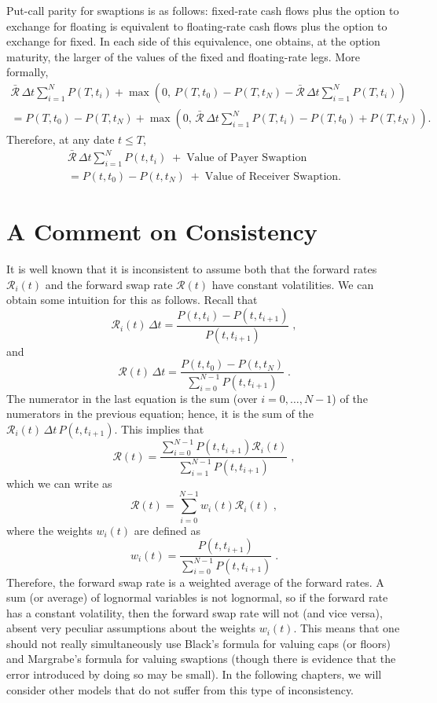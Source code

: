 Put-call parity  for swaptions is as follows: fixed-rate cash flows plus the option to exchange for floating is equivalent to floating-rate cash flows plus the option to exchange for fixed.  In each side of this equivalence, one obtains, at the option maturity, the larger of the values of the fixed and floating-rate legs.  More formally,
\begin{multline*} \bar{\mathcal{R}}\,\varDelta t \sum_{i=1}^N P(T,t_i) + \max\left(0, \,P(T,t_0)- P(T,t_N)-  \bar{\mathcal{R}}\,\varDelta t \sum_{i=1}^N P(T,t_i)\right) \\= P(T,t_0)- P(T,t_N) + \max\left(0,\,  \bar{\mathcal{R}}\,\varDelta t \sum_{i=1}^N P(T,t_i)-P(T,t_0)+ P(T,t_N)\right).
\end{multline*}
Therefore, at any date $t \leq T$,
\begin{multline}\label{swaptionparity}
\bar{\mathcal{R}}\,\varDelta t \sum_{i=1}^N P(t,t_i)\; + \;\text{Value of Payer Swaption}\\ = 
P(t,t_0)- P(t,t_N) \;+ \;\text{Value of Receiver Swaption}.
\end{multline}

\section{A Comment on Consistency}\label{s_consistency}
It is well known that it is inconsistent to assume both that the forward rates $\mathcal{R}_i(t)$ and 
the forward swap rate $\mathcal{R}(t)$ have constant volatilities.  We can obtain some intuition for this as follows.  Recall that
$$\mathcal{R}_i(t)\,\varDelta t = \frac{P(t,t_i)-P(t,t_{i+1})}{P(t,t_{i+1})}\; ,$$
and
$$\mathcal{R}(t)\,\varDelta t = \frac{P(t,t_0)-P(t,t_N)}{\sum_{i=0}^{N-1} P(t,t_{i+1})}\; .$$
The numerator in the last equation is the sum (over $i=0,\dots,N\!-\!1$) of the numerators in the previous equation; hence, it is the sum of the $\mathcal{R}_i(t)\,\varDelta t\,P(t,t_{i+1})$.  This implies that
$$\mathcal{R}(t) = \frac{\sum_{i=0}^{N-1} P(t,t_{i+1})\mathcal{R}_i(t)}{\sum_{i=1}^{N-1}P(t,t_{i+1})}\; ,$$
which we can write as
$$\mathcal{R}(t) = \sum_{i=0}^{N-1} w_i(t) \mathcal{R}_i(t)\; ,$$
where the weights $w_i(t)$ are defined as
$$w_i(t) = \frac{P(t,t_{i+1})}{\sum_{i=0}^{N-1}P(t,t_{i+1})}\; .$$
Therefore, the forward swap rate is a weighted average of the forward rates.  A sum (or average) of lognormal variables is not lognormal, so if the forward rate has a constant volatility, then the forward swap rate will not (and vice versa), absent very peculiar assumptions about the weights $w_i(t)$.
This means that one should not really simultaneously use Black's formula for valuing caps (or floors) and Margrabe's formula for valuing swaptions (though there is evidence that the error introduced by doing so may be small).  In the following chapters, we will consider other models that do not suffer from this type of inconsistency.

